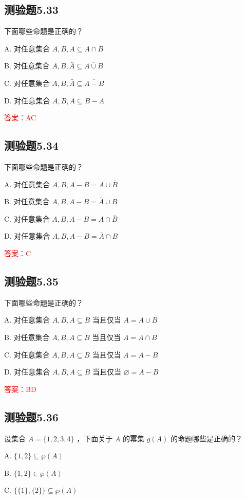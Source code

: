 \documentclass[UTF8, heading=true]{ctexart}
\begin{document}
\subsection{测验题5.33}

下面哪些命题是正确的？

A. 对任意集合 $A, B, \bar{A} \subseteq \overline{A \cap B}$

B. 对任意集合 $A, B, \bar{A} \subseteq \overline{A \cup B}$

C. 对任意集合 $A, B, \bar{A} \subseteq \overline{A-B}$

D. 对任意集合 $A, B, \bar{A} \subseteq \overline{B-A}$

\textcolor{red}{答案：AC}

\subsection{测验题5.34}
下面哪些命题是正确的？

A. 
对任意集合 $A, B, A-B=A \cup \bar{B}$

B. 对任意集合 $A, B, A-B=\bar{A} \cup B$

C. 对任意集合 $A, B, A-B=A \cap \bar{B}$

D. 对任意集合 $A, B, A-B=\bar{A} \cap B$

\textcolor{red}{答案：C}


\subsection{测验题5.35}
下面哪些命题是正确的？

A. 对任意集合 $A, B, A \subseteq B$ 当且仅当 $A=A \cup B$

B. 对任意集合 $A, B, A \subseteq B$ 当且仅当 $A=A \cap B$

C. 对任意集合 $A, B, A \subseteq B$ 当且仅当 $A=A-B$

D. 对任意集合 $A, B, A \subseteq B$ 当且仅当 $\varnothing=A-B$

\textcolor{red}{答案：BD}

\subsection{测验题5.36}

设集合 $A=\{1,2,3,4\}$ ，下面关于 $A$ 的幂集 $g(A)$ 的命题哪些是正确的？


A. $\{1,2\} \subseteq \wp(A) $

B. $\{1,2\} \in \wp(A) $

C. $\{\{1\},\{2\}\} \subseteq \wp(A) $
\end{document}
